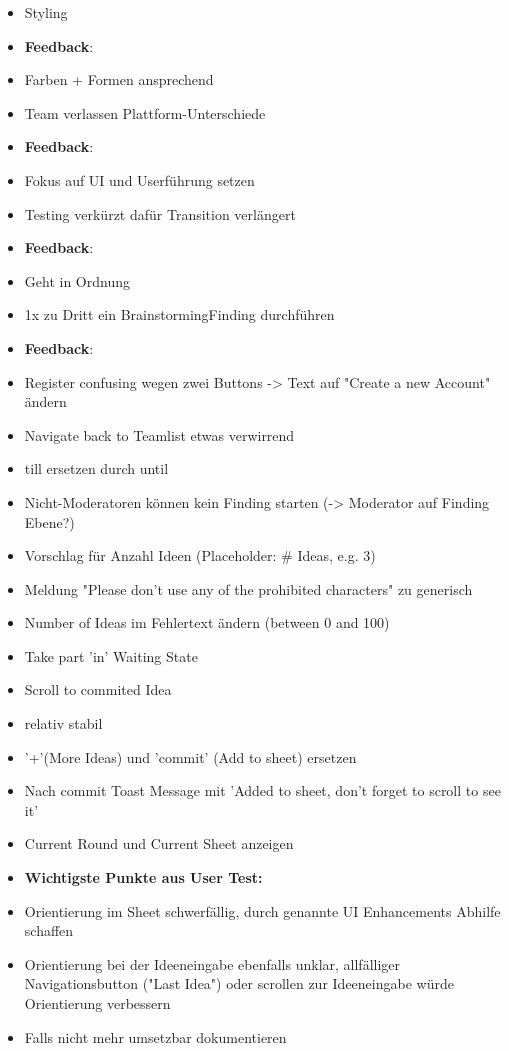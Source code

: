 \begin{itemize}
\item Styling 
\item \textbf{Feedback}:
\item Farben + Formen ansprechend
\item Team verlassen Plattform-Unterschiede 
\item \textbf{Feedback}:
\item Fokus auf UI und Userführung setzen
\item Testing verkürzt dafür Transition verlängert
\item \textbf{Feedback}:
\item Geht in Ordnung
\item 1x zu Dritt ein BrainstormingFinding durchführen
\item \textbf{Feedback}:
\item Register confusing wegen zwei Buttons -\textgreater{} Text auf "Create a new Account" ändern
\item Navigate back to Teamlist etwas verwirrend
\item till ersetzen durch until
\item Nicht-Moderatoren können kein Finding starten (-\textgreater{} Moderator auf Finding Ebene?)
\item Vorschlag für Anzahl Ideen (Placeholder: \# Ideas, e.g. 3)
\item Meldung "Please don't use any of the prohibited characters" zu generisch
\item Number of Ideas im Fehlertext ändern (between 0 and 100)
\item Take part 'in' Waiting State
\item Scroll to commited Idea
\item relativ stabil
\item '+'(More Ideas) und 'commit' (Add to sheet) ersetzen
\item Nach commit Toast Message mit 'Added to sheet, don't forget to scroll to see it'
\item Current Round und Current Sheet anzeigen
\item \textbf{Wichtigste Punkte aus User Test:}
\item Orientierung im Sheet schwerfällig, durch genannte UI Enhancements Abhilfe schaffen
\item Orientierung bei der Ideeneingabe ebenfalls unklar, allfälliger Navigationsbutton ("Last Idea") oder scrollen zur Ideeneingabe würde Orientierung verbessern
\item Falls nicht mehr umsetzbar dokumentieren 
\end{itemize}

